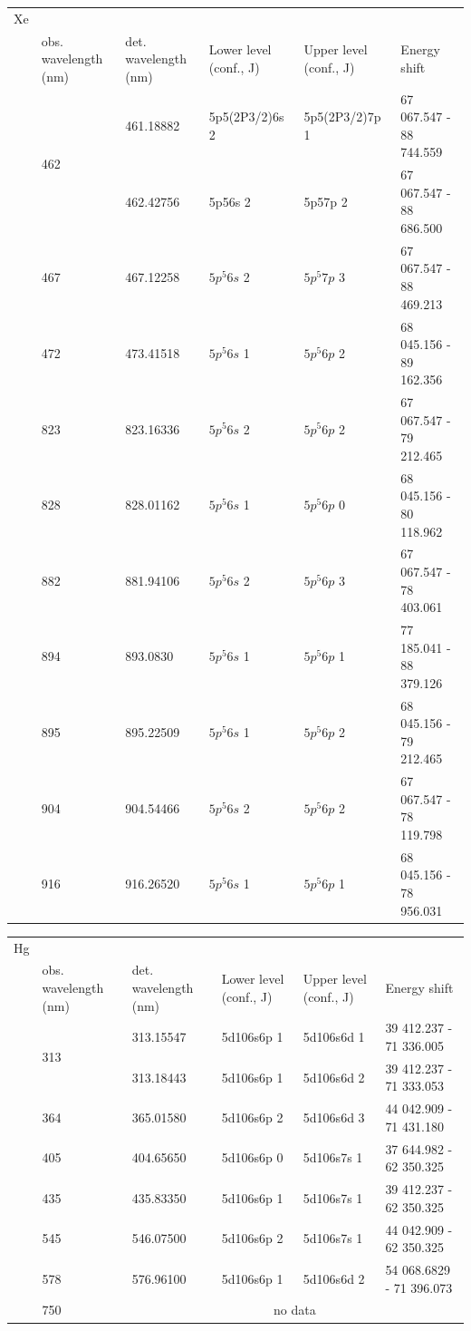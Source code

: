 \tabcolsep=0.11cm
\begin{tabular}{|l|l|l|l|l|l|}\hline
	Xe & \multicolumn{5}{c}{}  \\ 
	&  obs. wavelength (nm) & det. wavelength (nm) & Lower level (conf., J) & Upper level (conf., J) & Energy shift \\
	&  \multirow{2}{*}{462} & 461.18882 & 5p5(2P3/2)6s  2 & 5p5(2P3/2)7p  1 	& 67 067.547 	- 	88 744.559   \\
	& &  462.42756 & 5p56s 	 2 & 5p57p  2 &67 067.547 	- 	88 686.500 \\
	&  467 & 467.12258 & $5p^5 6s$  2 & $5p^5 7p$   3 &  67 067.547 	- 	88 469.213 \\
	&  472 & 473.41518 &  $5p^5 6s$  1 & $5p^5 6p$  2 & 68 045.156 	- 	89 162.356 \\
	&  823 & 823.16336 & $5p^5 6s$  2 & $5p^5 6p$  2 & 67 067.547 	- 	79 212.465 \\
	&  828 & 828.01162 &  $5p^5 6s$  1 & $5p^5 6p$  0 & 68 045.156 	- 	80 118.962 \\
	&  882 & 881.94106 &  $5p^5 6s$  2 & $5p^5 6p$  3 & 67 067.547 	- 	78 403.061 \\
	&  894 & 893.0830 & $5p^5 6s$  1 & $5p^5 6p$  1 & 77 185.041 	- 	88 379.126 	\\
	&  895 & 895.22509 & $5p^5 6s$  1 & $5p^5 6p$  2 & 68 045.156 	- 	79 212.465\\
	&  904 & 904.54466 & $5p^5 6s$ 	 2 & $5p^5 6p$  2 & 67 067.547 	- 	78 119.798 \\
	&  916 & 916.26520  &  $5p^5 6s$  1 &  $5p^5 6p$  1 & 68 045.156 	- 	78 956.031 \\ 
	 \hline
\end{tabular}

\tabcolsep=0.11cm
\begin{tabular}{|l|l|l|l|l|l|}\hline
	Hg & \multicolumn{5}{c}{} \\ 
	&  obs. wavelength (nm) & det. wavelength (nm) & Lower level (conf., J) & Upper level (conf., J) & Energy shift \\
	& \multirow{2}{*}{313} & 313.15547 & 5d106s6p  1& 5d106s6d 1& 39 412.237  	- 	71 336.005\\
	& & 313.18443 & 5d106s6p  1& 5d106s6d  2& 39 412.237  	- 	71 333.053\\
	& 364 & 365.01580 & 5d106s6p  2 &  5d106s6d  3 & 44 042.909  	- 	71 431.180 \\
	& 405 & 404.65650 & 5d106s6p  0 & 5d106s7s  1& 37 644.982  	- 	62 350.325\\
	& 435 & 435.83350 & 5d106s6p  1& 5d106s7s  1& 39 412.237  	- 	62 350.325 \\
	& 545 & 546.07500 & 5d106s6p  2& 5d106s7s  1& 44 042.909  	- 	62 350.325\\
	& 578 & 576.96100 & 5d106s6p  1& 5d106s6d  2& 54 068.6829 	- 	71 396.073\\
	& 750 & \multicolumn{4}{c}{no data}\\
	\hline
\end{tabular}

